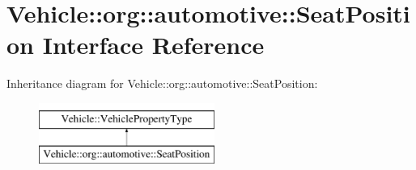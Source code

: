 \hypertarget{interfaceVehicle_1_1org_1_1automotive_1_1SeatPosition}{\section{Vehicle\-:\-:org\-:\-:automotive\-:\-:Seat\-Position Interface Reference}
\label{interfaceVehicle_1_1org_1_1automotive_1_1SeatPosition}
}
Inheritance diagram for Vehicle\-:\-:org\-:\-:automotive\-:\-:Seat\-Position\-:\begin{figure}[H]
\begin{center}
\leavevmode
\includegraphics[height=2.000000cm]{interfaceVehicle_1_1org_1_1automotive_1_1SeatPosition}
\end{center}
\end{figure}
